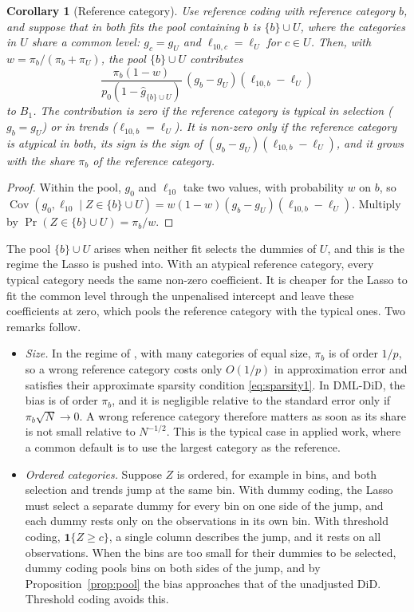 \documentclass[11pt]{article}
\newenvironment{ins}{\begin{leftbar}}{\end{leftbar}}
\theoremstyle{plain}
\newtheorem{corollary}[lemma]{Corollary}
\theoremstyle{remark}
\begin{document}
\begin{ins}
\begin{corollary}[Reference category] %
Use reference coding with reference category $b$, and suppose that in both fits
the pool containing $b$ is $\{b\}\cup U$, where the categories in $U$ share a
common level: $g_c=g_U$ and $\ell_{10,c}=\ell_U$ for $c\in U$. Then, with
$w=\pi_b/(\pi_b+\pi_U)$, the pool $\{b\}\cup U$ contributes
\[
  \frac{\pi_b(1-w)}{p_0(1-\hat g_{\{b\}\cup U})}\,(g_b-g_U)(\ell_{10,b}-\ell_U)
\]
to $B_1$. The contribution is zero if the reference category is typical in
selection ($g_b=g_U$) or in trends ($\ell_{10,b}=\ell_U$). It is non-zero only if
the reference category is atypical in both, its sign is the sign of
$(g_b-g_U)(\ell_{10,b}-\ell_U)$, and it grows with the share $\pi_b$ of the
reference category.
\end{corollary}
\begin{proof}
Within the pool, $g_0$ and $\ell_{10}$ take two values, with probability $w$ on
$b$, so
$\operatorname{Cov}(g_0,\ell_{10}\mid Z\in\{b\}\cup U)=w(1-w)(g_b-g_U)(\ell_{10,b}-\ell_U)$.
Multiply by $\Pr(Z\in\{b\}\cup U)=\pi_b/w$.
\end{proof}
The pool $\{b\}\cup U$ arises when neither fit selects the dummies of $U$, and
this is the regime the Lasso is pushed into. With an atypical reference
category, every typical category needs the same non-zero coefficient. It is
cheaper for the Lasso to fit the common level through the unpenalised intercept
and leave these coefficients at zero, which pools the reference category with
the typical ones. Two remarks follow.
\begin{itemize}
\item \emph{Size.} In the regime of \textcite{kolesar2026fragility}, with many
  categories of equal size, $\pi_b$ is of order $1/p$, so a wrong reference
  category costs only $O(1/p)$ in approximation error and satisfies their
  approximate sparsity condition \eqref{eq:sparsity1}. In DML-DiD, the bias is of
  order $\pi_b$, and it is negligible relative to the standard error only if
  $\pi_b\sqrt N\to0$. A wrong reference category therefore matters as soon as its
  share is not small relative to $N^{-1/2}$. This is the typical case in applied
  work, where a common default is to use the largest category as the reference.
\item \emph{Ordered categories.} Suppose $Z$ is ordered, for example in bins, and
  both selection and trends jump at the same bin. With dummy coding, the Lasso
  must select a separate dummy for every bin on one side of the jump, and each
  dummy rests only on the observations in its own bin. With threshold coding,
  $\mathbf 1\{Z\ge c\}$, a single column describes the jump, and it rests on all
  observations. When the bins are too small for their dummies to be selected,
  dummy coding pools bins on both sides of the jump, and by
  Proposition~\ref{prop:pool} the bias approaches that of the unadjusted DiD.
  Threshold coding avoids this.
\end{itemize}
\end{ins}
\end{document}
